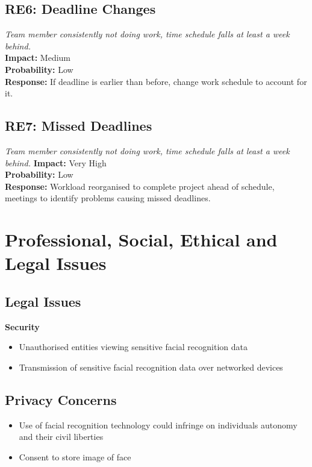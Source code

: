 \documentclass[11pt]{report}
\begin{document}
\subsection{RE6: Deadline Changes}
\textit{Team member consistently not doing work, time schedule falls at least a week behind.}\\
\textbf{Impact:} Medium \\
\textbf{Probability:} Low\\
\textbf{Response:} If deadline is earlier than before, change work schedule to account for it.

\subsection{RE7: Missed Deadlines}
\textit{Team member consistently not doing work, time schedule falls at least a week behind.}
\textbf{Impact:} Very High \\
\textbf{Probability:} Low\\
\textbf{Response:} Workload reorganised to complete project ahead of schedule, meetings to identify problems causing missed deadlines. 

\section{Professional, Social, Ethical and Legal Issues}


\subsection{Legal Issues}
\textbf{Security}
\begin{itemize}
	\item Unauthorised entities viewing sensitive facial recognition data
	\item Transmission of sensitive facial recognition data over networked devices
\end{itemize}

\subsection{Privacy Concerns}
\begin{itemize}
	\item Use of facial recognition technology could infringe on individuals autonomy and their civil liberties
	\item Consent to store image of face
\end{itemize}
\end{document}
